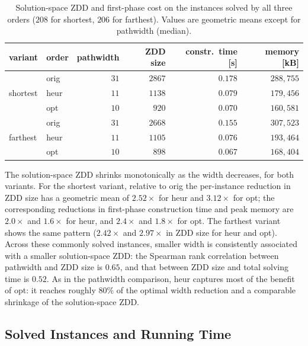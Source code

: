 \documentclass[conference]{IEEEtran}
\newcommand{\OrigDecom}{\textsf{orig}\xspace}
\newcommand{\HeurDecom}{\textsf{heur}\xspace}
\newcommand{\OptDecom}{\textsf{opt}\xspace}
\begin{document}
\begin{table}[t]
  \centering
  \caption{Solution-space ZDD and first-phase cost on the instances solved by all
  three orders ($208$ for shortest, $206$ for farthest). Values are geometric
  means except for pathwidth (median).}
  \label{tab:zddsize}
  \begin{tabular}{llrrrr}
    \hline
    variant & order & pathwidth & ZDD size & constr.\ time [s] & memory [kB] \\
    \hline
    \multirow{3}{*}{shortest}
      & \OrigDecom & $31$ & $2867$ & $0.178$ & $288{,}755$ \\
      & \HeurDecom & $11$ & $1138$ & $0.079$ & $179{,}456$ \\
      & \OptDecom  & $10$ & $\phantom{0}920$ & $0.070$ & $160{,}581$ \\
    \hline
    \multirow{3}{*}{farthest}
      & \OrigDecom & $31$ & $2668$ & $0.155$ & $307{,}523$ \\
      & \HeurDecom & $11$ & $1105$ & $0.076$ & $193{,}464$ \\
      & \OptDecom  & $10$ & $\phantom{0}898$ & $0.067$ & $168{,}404$ \\
    \hline
  \end{tabular}
\end{table}

The solution-space ZDD shrinks monotonically as the width decreases, for both
variants.
For the shortest variant, relative to \OrigDecom the per-instance reduction in
ZDD size has a geometric mean of $2.52\times$ for \HeurDecom and $3.12\times$ for
\OptDecom; the corresponding reductions in first-phase construction time and peak
memory are $2.0\times$ and $1.6\times$ for \HeurDecom, and $2.4\times$ and
$1.8\times$ for \OptDecom. The farthest variant shows the same pattern
($2.42\times$ and $2.97\times$ in ZDD size for \HeurDecom and \OptDecom).
Across these commonly solved instances, smaller width is consistently associated
with a smaller solution-space ZDD: the Spearman rank correlation between
pathwidth and ZDD size is $0.65$, and that between ZDD size and total solving
time is $0.52$.
As in the pathwidth comparison, \HeurDecom captures most of the benefit of
\OptDecom: it reaches roughly $80\%$ of the optimal width reduction and a
comparable shrinkage of the solution-space ZDD.

\subsection{Solved Instances and Running Time}
\label{subsec:solved}
\end{document}

